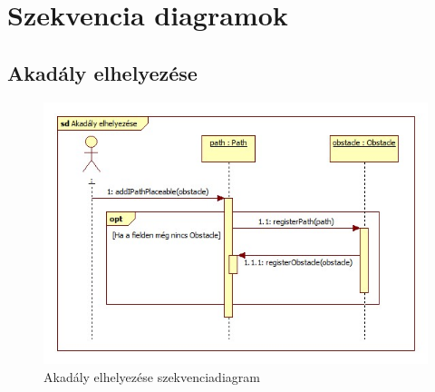 %

\section{Szekvencia diagramok}
\subsection{Akadály elhelyezése}
\begin{figure}[H]
\begin{center}
\includegraphics[width=17cm]{chapters/chapter03/images/Akadaly_elhelyezese.jpg}
\caption{Akadály elhelyezése szekvenciadiagram}
\label{fig:Akadály_elhelyezése}
\end{center}
\end{figure}

